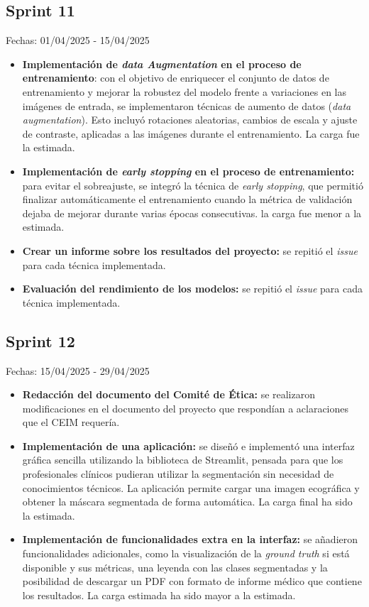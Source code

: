 \subsection{Sprint 11}
Fechas: 01/04/2025 - 15/04/2025
\begin{itemize}
    \item \textbf{Implementación de \textit{data Augmentation} en el proceso de entrenamiento}: con el objetivo de enriquecer el conjunto de datos de entrenamiento y mejorar la robustez del modelo frente a variaciones en las imágenes de entrada, se implementaron técnicas de aumento de datos (\textit{data augmentation}). Esto incluyó rotaciones aleatorias, cambios de escala y ajuste de contraste, aplicadas a las imágenes durante el entrenamiento. La carga fue la estimada.
    \item \textbf{Implementación de \textit{early stopping} en el proceso de entrenamiento:} para evitar el sobreajuste, se integró la técnica de \textit{early stopping}, que permitió finalizar automáticamente el entrenamiento cuando la métrica de validación dejaba de mejorar durante varias épocas consecutivas. la carga fue menor a la estimada.
    \item \textbf{Crear un informe sobre los resultados del proyecto:} se repitió el \textit{issue} para cada técnica implementada.
    \item \textbf{Evaluación del rendimiento de los modelos:} se repitió el \textit{issue} para cada técnica implementada.
\end{itemize}

\subsection{Sprint 12}
Fechas: 15/04/2025 - 29/04/2025
\begin{itemize}
    \item \textbf{Redacción del documento del Comité de Ética:} se realizaron modificaciones en el documento del proyecto que respondían a aclaraciones que el CEIM requería.
    \item \textbf{Implementación de una aplicación:} se diseñó e implementó una interfaz gráfica sencilla utilizando la biblioteca de Streamlit, pensada para que los profesionales clínicos pudieran utilizar la segmentación sin necesidad de conocimientos técnicos. La aplicación permite cargar una imagen ecográfica y obtener la máscara segmentada de forma automática. La carga final ha sido la estimada.
    \item \textbf{Implementación de funcionalidades extra en la interfaz:} se añadieron funcionalidades adicionales, como la visualización de la \textit{ground truth} si está disponible y sus métricas, una leyenda con las clases segmentadas y la posibilidad de descargar un PDF con formato de informe médico que contiene los resultados. La carga estimada ha sido mayor a la estimada.
\end{itemize}

